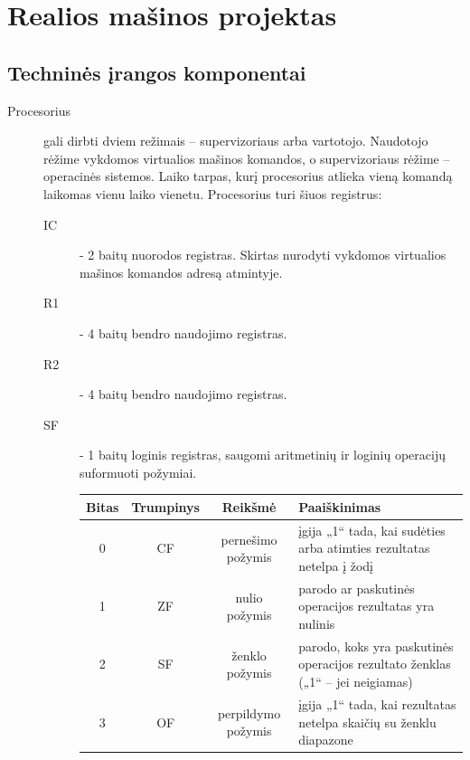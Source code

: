 \section{Realios mašinos projektas}

\subsection{Techninės įrangos komponentai}

\begin{description}
\item[Procesorius] gali dirbti dviem režimais – supervizoriaus arba vartotojo. Naudotojo rėžime vykdomos virtualios mašinos komandos, o supervizoriaus rėžime – operacinės sistemos. Laiko tarpas, kurį procesorius atlieka vieną komandą laikomas vienu laiko vienetu. Procesorius turi šiuos registrus:
    \begin{description}
        \item[IC] - 2 baitų nuorodos registras. Skirtas nurodyti vykdomos virtualios mašinos komandos adresą atmintyje.
        \item[R1] - 4 baitų bendro naudojimo registras.
        \item[R2] - 4 baitų bendro naudojimo registras.
        \item[SF] - 1 baitų loginis registras, saugomi aritmetinių ir loginių operacijų suformuoti požymiai.
            \begin{table}[H]
                \centering
                \begin{tabularx}{0.85\textwidth}{|c|c|c|X|} 
                   \hline
                   Bitas & Trumpinys & Reikšmė & Paaiškinimas \\
                   \hline
                   0 & CF & pernešimo požymis & įgija „1“ tada, kai sudėties arba
                   atimties rezultatas netelpa į žodį \\
                   \hline
                   1 & ZF & nulio požymis & parodo ar paskutinės operacijos 
                   rezultatas yra nulinis \\
                   \hline
                   2 & SF & ženklo požymis & parodo, koks yra paskutinės operacijos 
                   rezultato ženklas („1“ – jei neigiamas) \\
                   \hline
                   3 & OF & perpildymo požymis & įgija „1“ tada, kai rezultatas
                   netelpa skaičių su ženklu diapazone \\
                   \hline

\end{tabularx}
\end{table}
\end{description}
\end{description}
